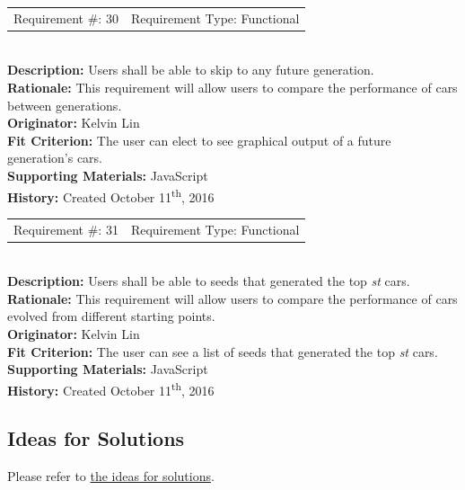 \documentclass[12pt, titlepage]{article}
\begin{document}
\begin{reqbox}
%
\begin{tabular}{cc}
Requirement \#: 30 & Requirement Type: Functional \\
\end{tabular} \\
%
\textbf{Description:} Users shall be able to skip to any future generation.\\
\textbf{Rationale:}  This requirement will allow users to compare the performance of cars between generations.\\
\textbf{Originator:} Kelvin Lin\\
\textbf{Fit Criterion:} The user can elect to see graphical output of a future generation's cars.\\
%  
\textbf{Supporting Materials:} JavaScript \\
\textbf{History:} Created October 11\textsuperscript{th}, 2016
%
\end{reqbox}

\begin{reqbox}
%
\begin{tabular}{cc}
Requirement \#: 31 & Requirement Type: Functional \\
\end{tabular} \\
%
\textbf{Description:} Users shall be able to seeds that generated the top \textit{st} cars. \\
\textbf{Rationale:}  This requirement will allow users to compare the performance of cars evolved from different starting points.\\
\textbf{Originator:} Kelvin Lin\\
\textbf{Fit Criterion:} The user can see a list of seeds that generated the top \textit{st} cars.\\
%  
\textbf{Supporting Materials:} JavaScript \\
\textbf{History:} Created October 11\textsuperscript{th}, 2016
%
\end{reqbox}

\subsection{Ideas for Solutions}
Please refer to \href{https://gitlab.cas.mcmaster.ca/linkk4/GrateBox/tree/master/Doc/Wireframes}{the ideas for solutions}.




\end{document}
